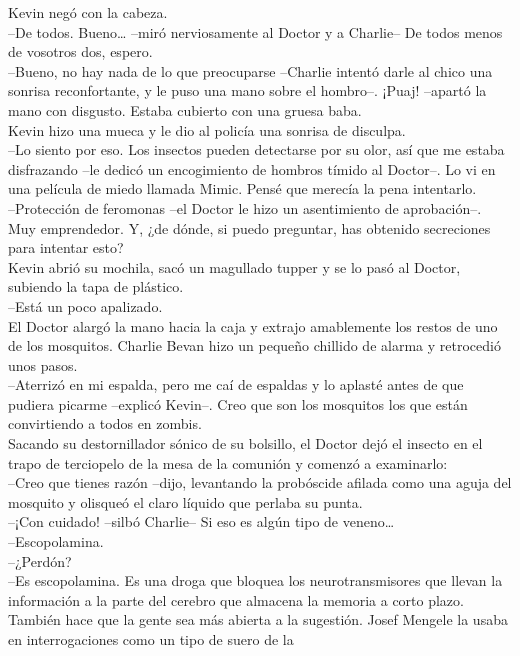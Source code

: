 Kevin negó con la cabeza.\\
--De todos. Bueno\ldots{} --miró nerviosamente al Doctor y a Charlie--
De todos menos de vosotros dos, espero.\\
--Bueno, no hay nada de lo que preocuparse --Charlie intentó darle al
chico una sonrisa reconfortante, y le puso una mano sobre el hombro--.
¡Puaj! --apartó la mano con disgusto. Estaba cubierto con una gruesa
baba.\\
Kevin hizo una mueca y le dio al policía una sonrisa de disculpa.\\
--Lo siento por eso. Los insectos pueden detectarse por su olor, así que
me estaba disfrazando --le dedicó un encogimiento de hombros tímido al
Doctor--. Lo vi en una película de miedo llamada Mimic. Pensé que
merecía la pena intentarlo.\\
--Protección de feromonas --el Doctor le hizo un asentimiento de
aprobación--. Muy emprendedor. Y, ¿de dónde, si puedo preguntar, has
obtenido secreciones para intentar esto?\\
Kevin abrió su mochila, sacó un magullado tupper y se lo pasó al Doctor,
subiendo la tapa de plástico.\\
--Está un poco apalizado.\\
El Doctor alargó la mano hacia la caja y extrajo amablemente los restos
de uno de los mosquitos. Charlie Bevan hizo un pequeño chillido de
alarma y retrocedió unos pasos.\\
--Aterrizó en mi espalda, pero me caí de espaldas y lo aplasté antes de
que pudiera picarme --explicó Kevin--. Creo que son los mosquitos los
que están convirtiendo a todos en zombis.\\
Sacando su destornillador sónico de su bolsillo, el Doctor dejó el
insecto en el trapo de terciopelo de la mesa de la comunión y comenzó a
examinarlo:\\
--Creo que tienes razón --dijo, levantando la probóscide afilada como
una aguja del mosquito y olisqueó el claro líquido que perlaba su
punta.\\
--¡Con cuidado! --silbó Charlie-- Si eso es algún tipo de
veneno\ldots{}\\
--Escopolamina.\\
--¿Perdón?\\
--Es escopolamina. Es una droga que bloquea los neurotransmisores que
llevan la información a la parte del cerebro que almacena la memoria a
corto plazo. También hace que la gente sea más abierta a la sugestión.
Josef Mengele la usaba en interrogaciones como un tipo de suero de la
